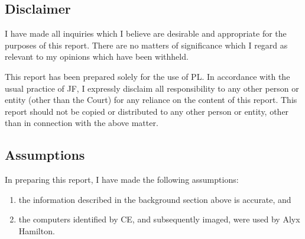 
\subsection{Disclaimer} %
\begin{myenum}
     \item I have made all inquiries which I believe are desirable and appropriate for the purposes of this report. There are no matters of significance which I regard as relevant to my opinions which have been withheld.
     \item This report has been prepared solely for the use of PL. In accordance with the usual practice of JF, I expressly disclaim all responsibility to any other person or entity (other than the Court) for any reliance on the content of this report. This report should not be copied or distributed to any other person or entity, other than in connection with the above matter.
\end{myenum}
\label{sub:disclaimer}


\subsection{Assumptions} %
\begin{myenum}
     
     \item In preparing this report, I have made the following assumptions:
         \begin{enumerate}
            \item the information described in the background section above is accurate, and 
            \item the computers identified by CE, and subsequently imaged, were used by Alyx Hamilton.
         \end{enumerate}
\end{myenum}
\label{sub:assumptions}


